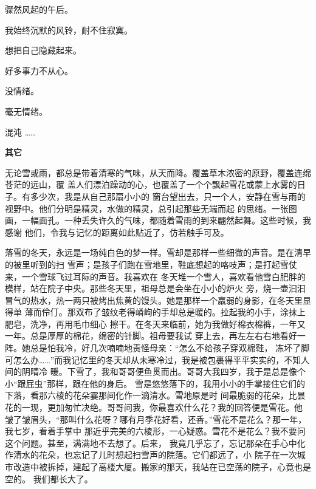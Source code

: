 \documentclass[12pt,a4paper]{article}
\def\blankrev{\vspace{1ex}}									%
\newcommand{\newsect}[1]{
	\begingroup
	\clearpage
	\par \vspace{2.8em}
	\LARGE\bfseries\centering #1
	\phantomsection \addcontentsline{toc}{section}{#1}
	\par %
	\endgroup
}
\begin{document}
		\blankrev
		骤然风起的午后。\par
		我始终沉默的风铃，耐不住寂寞。

	\endwriting



		想把自己隐藏起来。\par
		好多事力不从心。\par
		没情绪。\par
		毫无情绪。\par
		混沌 ……

	\endwriting

	\newsect{其它} %


		无论雪或雨，都总是带着清寒的气味，从天而降。覆盖草木浓密的原野，覆盖连绵苍茫的远山，覆
	盖人们漂泊躁动的心，也覆盖了一个个飘起雪花或蒙上水雾的日子。有多少次，我是从自己那扇小小的
	窗台望出去，只一个人，安静在雪与雨的视野中。他们分明是精灵，水做的精灵，总引起那些无端而起
	的思绪。一张图画，一幅面孔。一种丢失许久的气味，都随着雪雨的到来翩然起舞。这些时候，我感谢
	他们，令我与记忆的距离如此贴近了，仿若触手可及。

		落雪的冬天，永远是一场纯白色的梦一样。雪却是那样一些细微的声音。是在清早的被里听到的扫
	雪声；是孩子们跑在雪地里，鞋底想起的咯吱声；是打起雪仗来，一个雪球飞过耳际的声音。我喜欢在
	冬天堆一个雪人，喜欢看他雪白肥胖的模样，站在院子中央。那些冬天里，祖母总是会坐在小小的炉火
	旁，烧一壶汩汩冒气的热水，热一两只被烤出焦黄的馒头。她是那样一个羸弱的身影，在冬天里显得单
	薄而伶仃。那双布了皱纹老得嶙峋的手却总是暖的。拉起我的小手，涂抹上肥皂，洗净，再用毛巾细心
	擦干。在冬天来临前，她为我做好棉衣棉裤，一年又一年。总是厚厚的棉花，绵密的针脚。祖母要我试
	穿上去，再左左右右地看好一阵。她总是怕我冷，好几次喃喃地责怪母亲：“怎么不给孩子穿双棉鞋，
	冻坏了脚可怎么办……”而我记忆里的冬天却从未寒冷过，我是被包裹得平平实实的，不知人间的阴晴冷
	暖。下雪了，我和哥哥便鱼贯而出。哥哥大我四岁，我于是总是像个小“跟屁虫”那样，跟在他的身后。
	雪是悠悠落下的，我用小小的手掌接住它们的下落，看那六棱的花朵霎那间化作一滴清水。雪地原是时
	间最脆弱的花朵，比昙花的一现，更加匆忙决绝。哥哥问我，你最喜欢什么花？我的回答便是雪花。他
	皱了皱眉头，“那叫什么花呀？哪有月季花好看，还香。”雪花不是花么？那一年，我七岁，看着手掌中
	那近乎完美的六棱形，一心疑惑。雪花不是花么？我不要问这个问题。甚至，满满地不去想了。后来，
	我竟几乎忘了，忘记那朵在手心中化作清水的花朵，也忘记了儿时想起扫雪声的院落。它们都远了，小
	院子在一次城市改造中被拆掉，建起了高楼大厦。搬家的那天，我站在已空荡的院子，心竟也是空的。
	我们都长大了。
\end{document}
